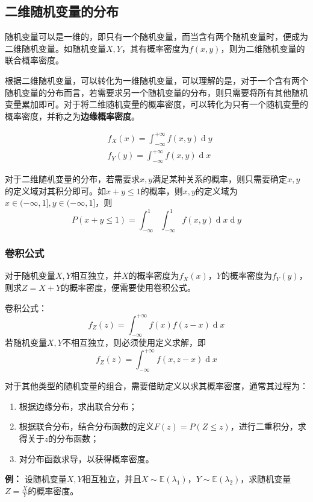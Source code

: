 \documentclass[12pt,a4paper]{article}
\begin{document}
  \subsection{二维随机变量的分布}
  随机变量可以是一维的，即只有一个随机变量，而当含有两个随机变量时，便成为二维随机变量。如随机变量$X,Y$，其有概率密度为$f(x,y)$，则为二维随机变量的联合概率密度。

  根据二维随机变量，可以转化为一维随机变量，可以理解的是，对于一个含有两个随机变量的分布而言，若需要求另一个随机变量的分布，则只需要将所有其他随机变量累加即可。对于将二维随机变量的概率密度，可以转化为只有一个随机变量的概率密度，并称之为\textbf{边缘概率密度}。

  $$
  \begin{aligned}
    &f_X(x) = \int _{-\infty}^{+\infty} f(x, y) \operatorname{d}y \\ 
    &f_Y(y) = \int_{-\infty}^{+\infty} f(x,y) \operatorname{d}x
  \end{aligned}
  $$

  对于二维随机变量的分布，若需要求$x,y$满足某种关系的概率，则只需要确定$x,y$的定义域对其积分即可。如$x+y\leq 1$的概率，则$x,y$的定义域为$x \in (-\infty, 1], y \in (-\infty, 1]$，则
  $$
  P(x+y\leq 1) = \int_{-\infty}^1 \int_{-\infty}^1 f(x,y) \operatorname{d}x\operatorname{d}y
  $$

  \subsubsection{卷积公式}
  对于随机变量$X,Y$相互独立，并$X$的概率密度为$f_X(x)$，$Y$的概率密度为$f_Y(y)$，则求$Z=X+Y$的概率密度，便需要使用卷积公式。

  卷积公式：
  $$
  f_Z(z) = \int _{-\infty}^{+\infty} f(x)f(z-x) \operatorname{d}x
  $$
  若随机变量$X,Y$不相互独立，则必须使用定义求解，即
  $$
  f_Z(z) = \int _{-\infty}^{+\infty} f(x, z-x) \operatorname{d} x
  $$

  对于其他类型的随机变量的组合，需要借助定义以求其概率密度，通常其过程为：
  \begin{enumerate}
    \item 根据边缘分布，求出联合分布；
    \item 根据联合分布，结合分布函数的定义$F(z)=P(Z\leq z)$，进行二重积分，求得关于$z$的分布函数；
    \item 对分布函数求导，以获得概率密度。
  \end{enumerate}

  \textbf{例：} 设随机变量$X,Y$相互独立，并且$X\sim \mathbb{E}(\lambda _1)$，$Y\sim \mathbb{E}(\lambda _2)$，求随机变量$Z=\frac{X}{Y}$的概率密度。
\end{document}
